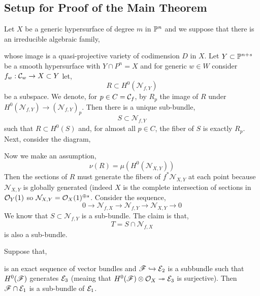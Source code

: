 \documentclass[12pt]{article}
\newcommand{\cN}{\mathcal{N}}
\begin{document}
\subsection{Setup for Proof of the Main Theorem}

Let $X$ be a generic hypersurface of degree $m$ in $\P^n$ and we suppose that there is an irreducible algebraic family,
\begin{center}
\end{center}
whose image is a quasi-projective variety of codimension $D$ in $X$. Let $Y \subset \P^{n+s}$ be a smooth hypersurface with $Y \cap P^n = X$ and for generic $w \in W$ consider $f_w : \C_w \to X \subset Y$ let,
\[ R \subset H^0(\cN_{f, Y}) \]
be a subspace. We denote, for $p \in C = \C_f$, by $R_p$ the image of $R$ under $H^0(\cN_{f,Y}) \to (\cN_{f,Y})_p$. Then there is a unique sub-bundle,
\[ S \subset \cN_{f,Y} \]
such that $R \subset H^0(S)$ and, for almost all $p \in C$, the fiber of $S$ is exactly $R_p$. Next, consider the diagram,
\begin{center}
\end{center}
Now we make an assumption,
\begin{equation}
\nu(R) = \mu(H^0(\cN_{X,Y})) \tag{$*$}
\end{equation}
Then the sections of $R$ must generate the fibers of $f^* \cN_{X,Y}$ at each point because $\cN_{X,Y}$ is globally generated (indeed $X$ is the complete intersection of sections in $\struct{Y}(1)$ so $\cN_{X,Y} = \struct{X}(1)^{\oplus s}$.  Consider the sequence,
\[ 0 \to \cN_{f,X} \to \cN_{f,Y} \to \cN_{X,Y} \to 0 \]
We know that $S \subset \cN_{f,Y}$ is a sub-bundle. The claim is that,
\[ T = S \cap \cN_{f,X} \]
is also a sub-bundle. 

\begin{lemma}
Suppose that,
\begin{center}
\end{center}
is an exact sequence of vector bundles and $\F \embed \E_2$ is a subbundle such that $H^0(\F)$ generates $\E_3$ (meaing that $H^0(\F) \ot \struct{X} \onto \E_3$ is surjective). Then $\F \cap \E_1$ is a sub-bundle of $\E_1$.
\end{lemma}
\end{document}
